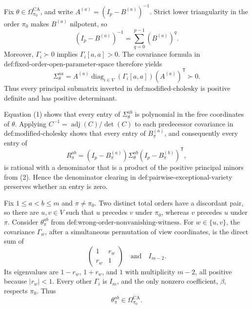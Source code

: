 Fix \(\theta\in\Omega_{\pi_0}^{\mathrm{CA}}\), and write \(A^{(a)}=(I_p-B^{(a)})^{-1}\).  Strict lower triangularity in the order \(\pi_0\) makes \(B^{(a)}\) nilpotent, so
\[
(I_p-B^{(a)})^{-1}=\sum_{q=0}^{p-1}(B^{(a)})^q.
\tag{1}
\]
Moreover, \(\Gamma_i\succ0\) implies \(\Gamma_i[a,a]>0\).  The covariance formula in \(\text{def:fixed-order-open-parameter-space}\) therefore yields
\[
\Sigma_\theta^{aa}
=A^{(a)}\operatorname{diag}_{i\in V}(\Gamma_i[a,a])(A^{(a)})^{\mathsf T}
\succ0.
\tag{2}
\]
Thus every principal submatrix inverted in \(\text{def:modified-cholesky}\) is positive definite and has positive determinant.

Equation (1) shows that every entry of \(\Sigma_\theta^{ab}\) is polynomial in the free coordinates of \(\theta\).  Applying
\(C^{-1}=\operatorname{adj}(C)/\det(C)\) to each predecessor covariance in \(\text{def:modified-cholesky}\) shows that every entry of \(B_\pi^{(a)}\), and consequently every entry of
\[
R_\pi^{ab}=(I_p-B_\pi^{(a)})\Sigma_\theta^{ab}
(I_p-B_\pi^{(b)})^{\mathsf T},
\tag{3}
\]
is rational with a denominator that is a product of the positive principal minors from (2).  Hence the denominator clearing in \(\text{def:pairwise-exceptional-variety}\) preserves whether an entry is zero.

Fix \(1\le a<b\le m\) and \(\pi\ne\pi_0\).  Two distinct total orders have a discordant pair, so there are \(u,v\in V\) such that \(u\) precedes \(v\) under \(\pi_0\), whereas \(v\) precedes \(u\) under \(\pi\).  Consider \(\theta_\pi^{ab}\) from \(\text{def:wrong-order-nonvanishing-witness}\).  For \(w\in\{u,v\}\), the covariance \(\Gamma_w\), after a simultaneous permutation of view coordinates, is the direct sum of
\[
\begin{pmatrix}1&r_w\\ r_w&1\end{pmatrix}
\quad\text{and}\quad I_{m-2}.
\]
Its eigenvalues are \(1-r_w\), \(1+r_w\), and \(1\) with multiplicity \(m-2\), all positive because \(|r_w|<1\).  Every other \(\Gamma_i\) is \(I_m\), and the only nonzero coefficient, \(\beta\), respects \(\pi_0\).  Thus
\[
\theta_\pi^{ab}\in\Omega_{\pi_0}^{\mathrm{CA}}.
\tag{4}
\]

